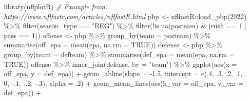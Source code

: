 \documentclass[
  11pt,
]{book}
\newenvironment{Shaded}{\begin{snugshade}}{\end{snugshade}}
\newcommand{\AttributeTok}[1]{\textcolor[rgb]{0.77,0.63,0.00}{#1}}
\newcommand{\CommentTok}[1]{\textcolor[rgb]{0.56,0.35,0.01}{\textit{#1}}}
\newcommand{\ConstantTok}[1]{\textcolor[rgb]{0.00,0.00,0.00}{#1}}
\newcommand{\DecValTok}[1]{\textcolor[rgb]{0.00,0.00,0.81}{#1}}
\newcommand{\FloatTok}[1]{\textcolor[rgb]{0.00,0.00,0.81}{#1}}
\newcommand{\FunctionTok}[1]{\textcolor[rgb]{0.00,0.00,0.00}{#1}}
\newcommand{\NormalTok}[1]{#1}
\newcommand{\OtherTok}[1]{\textcolor[rgb]{0.56,0.35,0.01}{#1}}
\newcommand{\SpecialCharTok}[1]{\textcolor[rgb]{0.00,0.00,0.00}{#1}}
\newcommand{\StringTok}[1]{\textcolor[rgb]{0.31,0.60,0.02}{#1}}
\theoremstyle{definition}
\theoremstyle{definition}
\theoremstyle{definition}
\theoremstyle{definition}
\theoremstyle{remark}
\begin{document}
\begin{Shaded}
\begin{Highlighting}[]
\FunctionTok{library}\NormalTok{(nflplotR)}
\CommentTok{\# Example from: https://www.nflfastr.com/articles/nflfastR.html}
\NormalTok{pbp }\OtherTok{\textless{}{-}}\NormalTok{ nflfastR}\SpecialCharTok{::}\FunctionTok{load\_pbp}\NormalTok{(}\DecValTok{2022}\NormalTok{) }\SpecialCharTok{\%\textgreater{}\%}
  \FunctionTok{filter}\NormalTok{(season\_type }\SpecialCharTok{==} \StringTok{"REG"}\NormalTok{) }\SpecialCharTok{\%\textgreater{}\%}
  \FunctionTok{filter}\NormalTok{(}\SpecialCharTok{!}\FunctionTok{is.na}\NormalTok{(posteam) }\SpecialCharTok{\&}\NormalTok{ (rush }\SpecialCharTok{==} \DecValTok{1} \SpecialCharTok{|}\NormalTok{ pass }\SpecialCharTok{==} \DecValTok{1}\NormalTok{))}
\NormalTok{offense }\OtherTok{\textless{}{-}}\NormalTok{ pbp }\SpecialCharTok{\%\textgreater{}\%} \FunctionTok{group\_by}\NormalTok{(}\AttributeTok{team =}\NormalTok{ posteam) }\SpecialCharTok{\%\textgreater{}\%}
  \FunctionTok{summarise}\NormalTok{(}\AttributeTok{off\_epa =} \FunctionTok{mean}\NormalTok{(epa, }\AttributeTok{na.rm =} \ConstantTok{TRUE}\NormalTok{))}
\NormalTok{defense }\OtherTok{\textless{}{-}}\NormalTok{ pbp }\SpecialCharTok{\%\textgreater{}\%} \FunctionTok{group\_by}\NormalTok{(}\AttributeTok{team =}\NormalTok{ defteam) }\SpecialCharTok{\%\textgreater{}\%} 
  \FunctionTok{summarise}\NormalTok{(}\AttributeTok{def\_epa =} \FunctionTok{mean}\NormalTok{(epa, }\AttributeTok{na.rm =} \ConstantTok{TRUE}\NormalTok{))}
\NormalTok{offense }\SpecialCharTok{\%\textgreater{}\%}
  \FunctionTok{inner\_join}\NormalTok{(defense, }\AttributeTok{by =} \StringTok{"team"}\NormalTok{) }\SpecialCharTok{\%\textgreater{}\%}
  \FunctionTok{ggplot}\NormalTok{(}\FunctionTok{aes}\NormalTok{(}\AttributeTok{x =}\NormalTok{ off\_epa, }\AttributeTok{y =}\NormalTok{ def\_epa)) }\SpecialCharTok{+}
  \FunctionTok{geom\_abline}\NormalTok{(}\AttributeTok{slope =} \SpecialCharTok{{-}}\FloatTok{1.5}\NormalTok{, }\AttributeTok{intercept =} \FunctionTok{c}\NormalTok{(.}\DecValTok{4}\NormalTok{, .}\DecValTok{3}\NormalTok{, .}\DecValTok{2}\NormalTok{, .}\DecValTok{1}\NormalTok{, }\DecValTok{0}\NormalTok{, }\SpecialCharTok{{-}}\NormalTok{.}\DecValTok{1}\NormalTok{, }\SpecialCharTok{{-}}\NormalTok{.}\DecValTok{2}\NormalTok{, }\SpecialCharTok{{-}}\NormalTok{.}\DecValTok{3}\NormalTok{), }\AttributeTok{alpha =}\NormalTok{ .}\DecValTok{2}\NormalTok{) }\SpecialCharTok{+}
  \FunctionTok{geom\_mean\_lines}\NormalTok{(}\FunctionTok{aes}\NormalTok{(}\AttributeTok{h\_var =}\NormalTok{ off\_epa, }\AttributeTok{v\_var =}\NormalTok{ def\_epa)) }\SpecialCharTok{+}

\end{Highlighting}
\end{Shaded}
\end{document}
